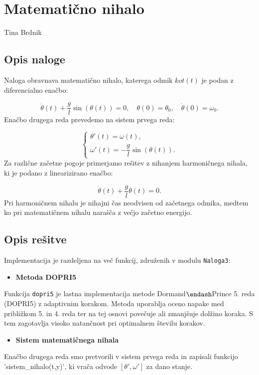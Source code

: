 \documentclass[12pt,a4paper]{article}
\begin{document}
\section{Matematično nihalo}
Tina Brdnik

\subsection{Opis naloge}
Naloga obravnava matematično nihalo, katerega odmik $kot(t)$ je podan z diferencialno enačbo:

\[
\ddot{\theta}(t) + \frac{g}{l}\sin(\theta(t)) = 0, \quad \theta(0) = \theta_0, \quad \dot{\theta}(0) = \omega_0.
\]
Enačbo drugega reda prevedemo na sistem prvega reda:

\[
\begin{cases}
\theta'(t) = \omega(t), \\
\omega'(t) = -\dfrac{g}{l}\sin(\theta(t)).
\end{cases}
\]
Za različne začetne pogoje primerjamo rešitev z nihanjem harmoničnega nihala, ki je podano z linearizirano enačbo:

\[
\ddot{\theta}(t) + \frac{g}{l}\theta(t) = 0.
\]
Pri harmoničnem nihalu je nihajni čas neodvisen od začetnega odmika, medtem ko pri matematičnem nihalu narašča z večjo začetno energijo.

\subsection{Opis rešitve}
Implementacija je razdeljena na več funkcij, združenih v modulu \texttt{Naloga3}:

\begin{itemize}
\item[1. ] \textbf{Metoda DOPRI5}  

\end{itemize}
Funkcija \texttt{dopri5} je lastna implementacija metode Dormand\ensuremath{\endash}Prince 5. reda (DOPRI5) z adaptivnim korakom.  Metoda uporablja oceno napake med približkom 5. in 4. reda ter na tej osnovi povečuje ali zmanjšuje dolžino koraka.  S tem zagotavlja visoko natančnost pri optimalnem številu korakov.

\begin{itemize}
\item[2. ] \textbf{Sistem matematičnega nihala}  

\end{itemize}
Enačbo drugega reda smo pretvorili v sistem prvega reda in zapisali funkcijo 'sistem\_nihalo(t,y)', ki vrača odvode $[\theta', \omega']$ za dano stanje.
\end{document}
